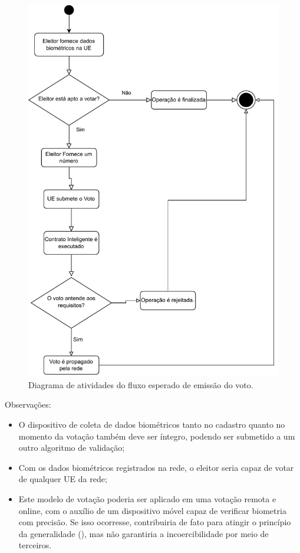 \documentclass[portuguese]{textolivre}
\begin{document}
	
	\begin{figure}[htbp]
		\centering
		\begin{minipage}{.8\textwidth}
			\includegraphics[width=\textwidth]{fig-003.pdf} %
			\caption{Diagrama de atividades do fluxo esperado de emissão do voto.}
			\label{diagramaatividades}
		\end{minipage}
	\end{figure}
	
	
	Observações: 
	\begin{itemize}
		\item O dispositivo de coleta de dados biométricos tanto no cadastro quanto no momento da votação também deve ser íntegro, podendo ser submetido a um outro algoritmo de validação;
		\item Com os dados biométricos registrados na rede, o eleitor seria capaz de votar de qualquer UE da rede;
		\item Este modelo de votação poderia ser aplicado em uma votação remota e online, com o auxílio de um dispositivo móvel capaz de verificar biometria com precisão. Se isso ocorresse, contribuiria de fato para atingir o princípio da generalidade (), mas não garantiria a incoercibilidade por meio de terceiros.
	\end{itemize}
	
\end{document}
